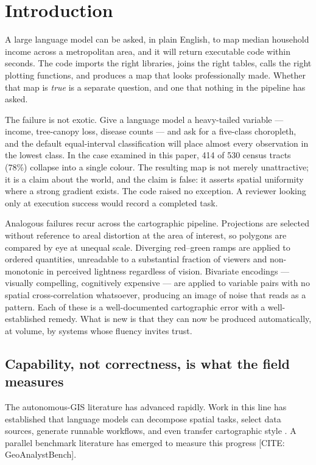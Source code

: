 \section{Introduction}
A large language model can be asked, in plain English, to map median household income across a metropolitan area, and it will return executable code within seconds. The code imports the right libraries, joins the right tables, calls the right plotting functions, and produces a map that looks professionally made. Whether that map is \emph{true} is a separate question, and one that nothing in the pipeline has asked.

The failure is not exotic. Give a language model a heavy-tailed variable --- income, tree-canopy loss, disease counts --- and ask for a five-class choropleth, and the default equal-interval classification will place almost every observation in the lowest class. In the case examined in this paper, 414 of 530 census tracts (78\%) collapse into a single colour. The resulting map is not merely unattractive; it is a claim about the world, and the claim is false: it asserts spatial uniformity where a strong gradient exists. The code raised no exception. A reviewer looking only at execution success would record a completed task.

Analogous failures recur across the cartographic pipeline. Projections are selected without reference to areal distortion at the area of interest, so polygons are compared by eye at unequal scale. Diverging red--green ramps are applied to ordered quantities, unreadable to a substantial fraction of viewers and non-monotonic in perceived lightness regardless of vision. Bivariate encodings --- visually compelling, cognitively expensive --- are applied to variable pairs with no spatial cross-correlation whatsoever, producing an image of noise that reads as a pattern. Each of these is a well-documented cartographic error with a well-established remedy. What is new is that they can now be produced automatically, at volume, by systems whose fluency invites trust.

\subsection{Capability, not correctness, is what the field measures}
The autonomous-GIS literature has advanced rapidly. Work in this line has established that language models can decompose spatial tasks, select data sources, generate runnable workflows, and even transfer cartographic style \cite{li2023autonomous,li2025giscience,akinboyewa2025giscopilot,ning2025llmfind,wang2025cartoagent}. A parallel benchmark literature has emerged to measure this progress \cite{krechetova2025geobenchx} [CITE: GeoAnalystBench].

